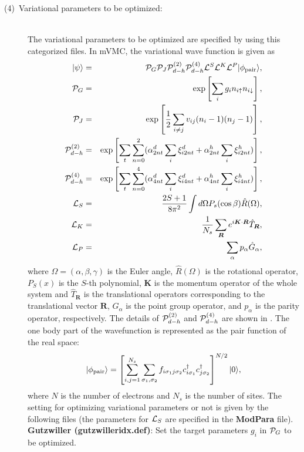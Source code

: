 \begin{description}
\item[(4)~Variational parameters to be optimized:] 
~\\The variational parameters to be optimized are specified by using this categorized files. In mVMC, the variational wave function is given as
\begin{eqnarray}
|\psi \rangle &=& {\cal P}_G{\cal P}_J{\cal P}_{d-h}^{(2)}{\cal P}_{d-h}^{(4)}{\cal L}^S{\cal L}^K{\cal L}^P |\phi_{\rm pair} \rangle,\\
{\cal P}_G&=&\exp\left[ \sum_i g_i n_{i\uparrow} n_{i\downarrow} \right],\\
{\cal P}_J&=&\exp\left[\frac{1}{2} \sum_{i\neq j} v_{ij} (n_i-1)(n_j-1)\right],\\
{\cal P}_{d-h}^{(2)}&=& \exp \left[ \sum_t \sum_{n=0}^2 (\alpha_{2nt}^d \sum_{i}\xi_{i2nt}^d+\alpha_{2nt}^h \sum_{i}\xi_{i2nt}^h)\right],\\
{\cal P}_{d-h}^{(4)}&=& \exp \left[ \sum_t \sum_{n=0}^4 (\alpha_{4nt}^d \sum_{i}\xi_{i4nt}^d+\alpha_{4nt}^h \sum_{i}\xi_{i4nt}^h)\right],\\
{\cal L}_S&=&\frac{2S+1}{8 \pi^2}\int d\Omega P_s(\cos \beta) \hat{R}(\Omega),\\
{\cal L}_K&=&\frac{1}{N_s}\sum_{{\bm R}}e^{i {\bm K} \cdot{\bm R} } \hat{T}_{\bm R},\\
{\cal L}_P&=&\sum_{\alpha}p_{\alpha} \hat{G}_{\alpha},
\end{eqnarray}
where $\Omega=(\alpha, \beta, \gamma)$ is the Euler angle, $\hat{R}(\Omega)$ is the rotational operator, $P_S(x)$ is the $S$-th polynomial, ${\bm K}$ is the momentum operator of the whole system and $\hat{T}_{\bm R}$ is the translational operators corresponding to the translational vector ${\bm R}$, $\hat{G}_{\alpha}$ is the point group operator, and $p_\alpha$ is the parity operator, respectively. The details of ${\cal P}_{d-h}^{(2)}$ and ${\cal P}_{d-h}^{(4)}$ are shown in \cite{Tahara2008}. The one body part of the wavefunction is represented as the pair function of the real space:
\begin{equation}
|\phi_{\rm pair} \rangle = \left[\sum_{i, j=1}^{N_s} \sum_{\sigma_1, \sigma_2}f_{i\sigma_1j \sigma_2}c_{i\sigma_1}^{\dag}c_{j\sigma_2}^{\dag} \right]^{N/2}|0 \rangle,
\end{equation}
where $N$ is the number of electrons and $N_s$ is the number of sites.
The setting for optimizing variational parameters or not is given by the following files (the parameters for ${\cal L}_S$ are specified in the {\bf ModPara} file).
~\\{\bf Gutzwiller  (gutzwilleridx.def)}: Set the target parameters $g_i$ in ${\cal P}_G$ to be optimized.

\end{description}
